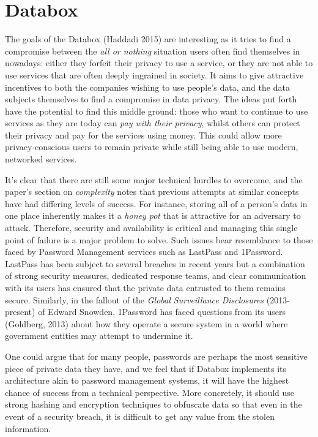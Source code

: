 \documentclass[format=acmsmall, review=false, screen=true]{acmart}
\begin{document}
\section{Databox}
The goals of the Databox (Haddadi 2015) are interesting as it tries to find a compromise between the \textit{all or nothing} situation users often find themselves in nowadays: either they forfeit their privacy to use a service, or they are not able to use services that are often deeply ingrained in society. It aims to give attractive incentives to both the companies wishing to use people's data, and the data subjects themselves to find a compromise in data privacy. The ideas put forth have the potential to find this middle ground: those who want to continue to use services as they are today can \textit{pay with their privacy}, whilst others can protect their privacy and pay for the services using money. This could allow more privacy-conscious users to remain private while still being able to use modern, networked services.

It’s clear that there are still some major technical hurdles to overcome, and the paper’s section on \textit{complexity} notes that previous attempts at similar concepts have had differing levels of success. For instance, storing all of a person’s data in one place inherently makes it a \textit{honey pot} that is attractive for an adversary to attack. Therefore, security and availability is critical and managing this single point of failure is a major problem to solve. Such issues bear resemblance to those faced by Password Management services such as LastPass and 1Password. LastPass has been subject to several breaches in recent years but a combination of strong security measures, dedicated response teams, and clear communication with its users has ensured that the private data entrusted to them remains secure. Similarly, in the fallout of the \textit{Global Surveillance Disclosures} (2013-present) of Edward Snowden, 1Password has faced questions from its users (Goldberg, 2013) about how they operate a secure system in a world where government entities may attempt to undermine it.

One could argue that for many people, passwords are perhaps the most sensitive piece of private data they have, and we feel that if Databox implements its architecture akin to password management systems, it will have the highest chance of success from a technical perspective. More concretely, it should use strong hashing and encryption techniques to obfuscate data so that even in the event of a security breach, it is difficult to get any value from the stolen information.
\end{document}
